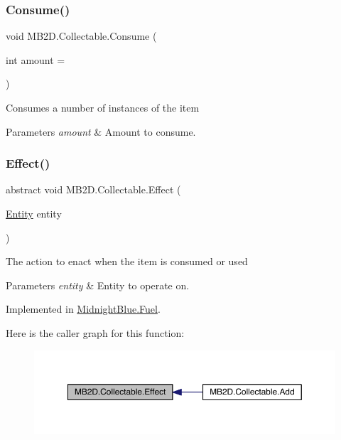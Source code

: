 \subsubsection{\texorpdfstring{Consume()}{Consume()}}
{\footnotesize\ttfamily void M\+B2\+D.\+Collectable.\+Consume (\begin{DoxyParamCaption}\item[{int}]{amount = {} }\end{DoxyParamCaption})\hspace{0.3cm}{\ttfamily [inline]}}



Consumes a number of instances of the item 


\begin{DoxyParams}{Parameters}
{\em amount} & Amount to consume.\\
\hline
\end{DoxyParams}
\hypertarget{class_m_b2_d_1_1_collectable_aeb2c8847eb3d5937b015f298703fd753}{}\label{class_m_b2_d_1_1_collectable_aeb2c8847eb3d5937b015f298703fd753} 
\subsubsection{\texorpdfstring{Effect()}{Effect()}}
{\footnotesize\ttfamily abstract void M\+B2\+D.\+Collectable.\+Effect (\begin{DoxyParamCaption}\item[{\hyperlink{class_m_b2_d_1_1_entity_component_1_1_entity}{Entity}}]{entity }\end{DoxyParamCaption})\hspace{0.3cm}{\ttfamily [pure virtual]}}



The action to enact when the item is consumed or used 


\begin{DoxyParams}{Parameters}
{\em entity} & Entity to operate on.\\
\hline
\end{DoxyParams}


Implemented in \hyperlink{class_midnight_blue_1_1_fuel_a9ab52c79211ec8cdcc9389f772615ac0}{Midnight\+Blue.\+Fuel}.

Here is the caller graph for this function\+:
\nopagebreak
\begin{figure}[H]
\begin{center}
\leavevmode
\includegraphics[width=350pt]{class_m_b2_d_1_1_collectable_aeb2c8847eb3d5937b015f298703fd753_icgraph}
\end{center}
\end{figure}


